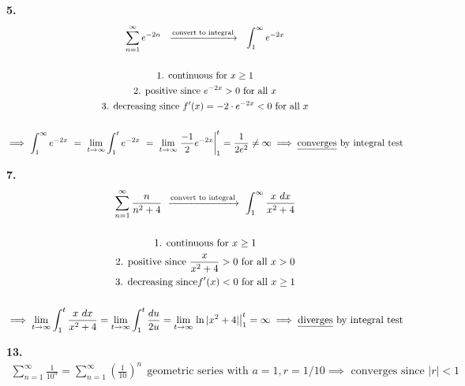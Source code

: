 \documentclass{article}
\begin{document}
\newpage



\noindent
\textbf{
5.
}
\\
\begin{gather*}
\sum_{n=1}^{\infty} e^{-2n}
~~\xrightarrow{\text{convert to integral}}~~
\int_{1}^{\infty} e^{-2x}
\\
\\
\text{1. continuous for } x \geq 1
\\
\text{2. positive since } e^{-2x} > 0 \text{ for all } x
\\
\text{3. decreasing since }
f'(x)=-2\cdot e^{-2x} < 0 \text{ for all } x
\\
\\
\implies
\int_{1}^{\infty} e^{-2x}
~=~
\lim_{t \to \infty}
\int_{1}^t e^{-2x}
~=~
\lim_{t \to \infty}
\left. \frac{-1}{2} e^{-2x} \right|_1^t=\frac{1}{2e^2} \neq \infty
\implies \text{\underline{converges} by integral test}
\\
\end{gather*}



\noindent
\textbf{
7.
}
\\
\begin{gather*}
\sum_{n=1}^{\infty} \frac{n}{n^2+4}
~\xrightarrow{\text{convert to integral}}~
\int_1^{\infty} \frac{x~dx}{x^2+4}
\\
\\
\text{1. continuous for } x \geq 1
\\
\text{2. positive since } \frac{x}{x^2+4} > 0 \text{ for all } x > 0
\\
\text{3. decreasing since} f'(x)<0 \text{ for all } x \geq 1
\\
\\
\implies
\lim_{t \to \infty} 
\int_1^t \frac{x~dx}{x^2+4}
=
\lim_{t \to \infty} 
\int_1^t \frac{du}{2u}
=
\lim_{t \to \infty}
\left. \ln|x^2+4| \right|_1^t=\infty
\implies \text{\underline{diverges} by integral test}
\\
\end{gather*}



\noindent
\textbf{
13.
}
\\
\begin{gather*}
\sum_{n=1}^{\infty} \frac{1}{10^n}
=\sum_{n=1}^{\infty} \left(\frac{1}{10}\right)^n
~~\text{geometric series with } a=1, r=1/10 \implies \text{ converges since } |r|<1
\\
\end{gather*}
\end{document}
